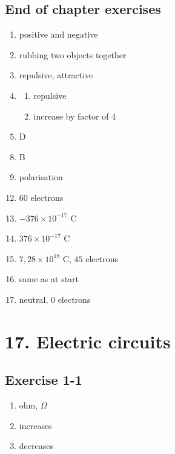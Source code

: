\subsection{End of chapter exercises}
\begin{multicols}{3}
 \begin{enumerate}[noitemsep, label=\textbf{(\arabic*)} ]
\item positive and negative
\item rubbing two objects together
\item repulsive, attractive
\item 
 \begin{enumerate}[noitemsep, label=\textbf{(\alph*)} ]
\item repulsive
\item increase by factor of 4
 \end{enumerate}
\item D
 \end{enumerate}
\begin{enumerate}[noitemsep, label=\textbf{(\arabic*)} ]
\setcounter{enumi}{7}
 \item B
\item polarisation
\end{enumerate}
\begin{enumerate}[noitemsep, label=\textbf{(\arabic*)} ]
\setcounter{enumi}{11}
 \item $60$ electrons
\item $-376 \times 10^{−17} \text{ C}$
\item $376 \times 10^{−17} \text{ C}$
\item $7,28 \times 10^{18} \text{ C}$, $45$ electrons
\item same as at start
\item neutral, $0$ electrons
\end{enumerate}
\end{multicols}

\section{17. Electric circuits}
\subsection{Exercise 1-1}
\begin{multicols}{3}
 \begin{enumerate}[noitemsep, label=\textbf{(\arabic*)} ]
\item ohm, $\Omega$
\item increases
\item decreases
 \end{enumerate}
\end{multicols}

